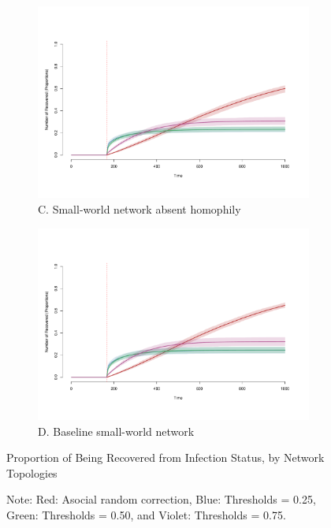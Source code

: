 \documentclass[man, 12pt, a4paper, nolmodern, noextraspace]{apa6}
\begin{document}
\begin{figure}
    \vspace{1cm}
    \begin{subfigure}[t]{0.49\textwidth}
        \centering
        \includegraphics[trim={1.5cm 2.7cm 2cm 5cm}, clip, width=\linewidth]{draft/Fig3c.pdf} 
        \caption*{C. Small-world network absent homophily} \label{fig3:nohomophily}
    \end{subfigure}
    \hfill
    \begin{subfigure}[t]{0.49\textwidth}
        \centering
        \includegraphics[trim={1.5cm 2.7cm 2cm 5cm}, clip, width=\linewidth]{draft/Fig3d.pdf} 
        \caption*{D. Baseline small-world network} \label{fig3:smallworld}
    \end{subfigure}
    
    \vspace{1cm}
    \captionsetup{format=hang}
    \caption{Proportion of Being Recovered from Infection Status, by Network Topologies} 
    \label{fig:Figure3}
    \captionsetup{font=small}
    \caption*{Note: Red: Asocial random correction, Blue: Thresholds = 0.25, Green: Thresholds = 0.50, and Violet: Thresholds = 0.75.} 
\end{figure}
    
\end{document}
